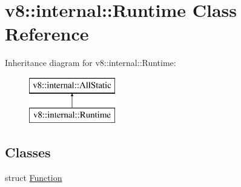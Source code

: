 \hypertarget{classv8_1_1internal_1_1_runtime}{}\section{v8\+:\+:internal\+:\+:Runtime Class Reference}
\label{classv8_1_1internal_1_1_runtime}
Inheritance diagram for v8\+:\+:internal\+:\+:Runtime\+:\begin{figure}[H]
\begin{center}
\leavevmode
\includegraphics[height=2.000000cm]{classv8_1_1internal_1_1_runtime}
\end{center}
\end{figure}
\subsection*{Classes}
\begin{DoxyCompactItemize}
\item 
struct \hyperlink{structv8_1_1internal_1_1_runtime_1_1_function}{Function}
\end{DoxyCompactItemize}
